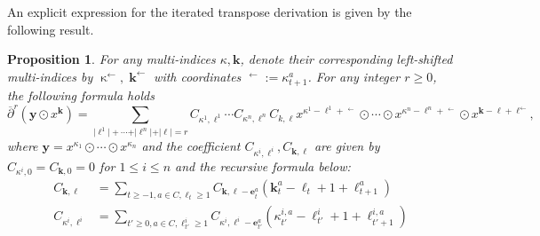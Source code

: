 \documentclass[a4paper,11pt]{article}
\newtheorem{proposition}[theorem]{Proposition}
\def\shift#1{\mathop{#1}^{\leftarrow}\limits}
\begin{document}
An explicit expression for the iterated transpose derivation is given by the following result.
\begin{proposition}
\label{prop:formula_partial_bar}
For any multi-indices $\kappa, \mathbf k$, denote their corresponding left-shifted multi-indices by $\shift{\kappa},\shift{\mathbf k}$ with coordinates $\shift{\kappa_t^a}:=\kappa_{t+1}^a$.
For any integer $r\geq 0$, the following formula holds
\[
    \overline{\partial}^r( \mathbf y\odot  x^{\mathbf k})=\sum_{\vert\ell^1\vert +\cdots + \vert\ell^n\vert + \vert\ell\vert=r}C_{\kappa^1, \ell^1}\cdots C_{\kappa^n, \ell^n}C_{ k, \ell} x^{\kappa^1 - \ell^1 + \shift{\ell^1}}\odot \cdots\odot   x^{\kappa^n - \ell^n + \shift{\ell^n}}\odot  x^{\mathbf k - \ell + \shift{\ell}},
\]
where $\mathbf y=x^{\kappa_1}\odot \cdots \odot x^{\kappa_n}$ and the coefficient $C_{\kappa^i, \ell^i}, C_{\mathbf k, \ell}$ are given by $C_{\kappa^i, 0}=C_{\mathbf k, 0}=0$ for $1 \le i\le n$ and the recursive formula below:
\begin{align*}
    C_{\mathbf k, \ell} & = \sum_{t\geq -1, a\in C, \ell_t\geq 1}C_{\mathbf k, \ell -\mathbf e_t^a}(\mathbf k_t^a - \ell_t + 1 + \ell_{t+1}^a)\\
C_{\kappa^i, \ell^i} & = \sum_{t'\geq 0, a\in C, \ell^i_{t'}\geq 1} C_{ \kappa^i, \ell^i-\mathbf e_{t'}^a}(\kappa^{i,a}_{t'} - \ell^i_{t'} + 1 + \ell^{i,a}_{t'+1})
\end{align*}
\end{proposition}
\end{document}
